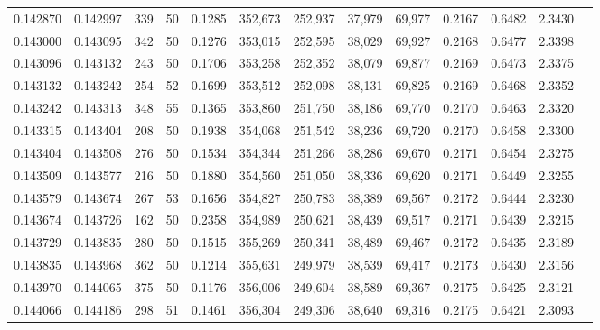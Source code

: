 \begin{tabular}{rrrrrrrrrrrrr}
0.142870 & 0.142997 &   339 &  50 &                                     0.1285 & 352,673 & 252,937 &  37,979 &  69,977 & 0.2167 & 0.6482 & 2.3430 \\
0.143000 & 0.143095 &   342 &  50 &                                     0.1276 & 353,015 & 252,595 &  38,029 &  69,927 & 0.2168 & 0.6477 & 2.3398 \\
0.143096 & 0.143132 &   243 &  50 &                                     0.1706 & 353,258 & 252,352 &  38,079 &  69,877 & 0.2169 & 0.6473 & 2.3375 \\
0.143132 & 0.143242 &   254 &  52 &                                     0.1699 & 353,512 & 252,098 &  38,131 &  69,825 & 0.2169 & 0.6468 & 2.3352 \\
0.143242 & 0.143313 &   348 &  55 &                                     0.1365 & 353,860 & 251,750 &  38,186 &  69,770 & 0.2170 & 0.6463 & 2.3320 \\
0.143315 & 0.143404 &   208 &  50 &                                     0.1938 & 354,068 & 251,542 &  38,236 &  69,720 & 0.2170 & 0.6458 & 2.3300 \\
0.143404 & 0.143508 &   276 &  50 &                                     0.1534 & 354,344 & 251,266 &  38,286 &  69,670 & 0.2171 & 0.6454 & 2.3275 \\
0.143509 & 0.143577 &   216 &  50 &                                     0.1880 & 354,560 & 251,050 &  38,336 &  69,620 & 0.2171 & 0.6449 & 2.3255 \\
0.143579 & 0.143674 &   267 &  53 &                                     0.1656 & 354,827 & 250,783 &  38,389 &  69,567 & 0.2172 & 0.6444 & 2.3230 \\
0.143674 & 0.143726 &   162 &  50 &                                     0.2358 & 354,989 & 250,621 &  38,439 &  69,517 & 0.2171 & 0.6439 & 2.3215 \\
0.143729 & 0.143835 &   280 &  50 &                                     0.1515 & 355,269 & 250,341 &  38,489 &  69,467 & 0.2172 & 0.6435 & 2.3189 \\
0.143835 & 0.143968 &   362 &  50 &                                     0.1214 & 355,631 & 249,979 &  38,539 &  69,417 & 0.2173 & 0.6430 & 2.3156 \\
0.143970 & 0.144065 &   375 &  50 &                                     0.1176 & 356,006 & 249,604 &  38,589 &  69,367 & 0.2175 & 0.6425 & 2.3121 \\
0.144066 & 0.144186 &   298 &  51 &                                     0.1461 & 356,304 & 249,306 &  38,640 &  69,316 & 0.2175 & 0.6421 & 2.3093 \\

\end{tabular}
